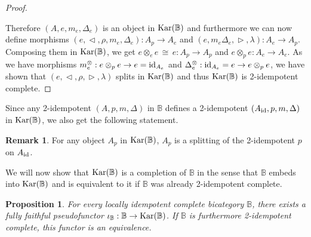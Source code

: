 \documentclass[12pt,oneside,reqno,a4paper]{article}
\newtheorem{proposition}[theorem]{Proposition}
\theoremstyle{definition}
\newtheorem{remark}[theorem]{Remark}
\newcommand{\Kar}[1]{\textup{Kar}(#1)}
\newcommand{\iso}{\,\cong\,}
\newcommand{\id}{\textup{id}}
\newcommand{\bB}{\mathbb{B}}
\newcommand{\lt}{\vartriangleleft}
\newcommand{\rt}{\vartriangleright}
\begin{document}
\begin{proof}
\begin{center}
\end{center}

Therefore $(A,e,m_e,\Delta_e)$ is an object in $\Kar{\bB}$ and furthermore we can now define morphisms $(e,\lt,\rho,m_e,\Delta_e):A_p\to A_e$ and $(e,m_e\Delta_e,\rt,\lambda):A_e\to A_p$. Composing them in $\Kar{\bB}$, we get $e\otimes_e e\iso e:A_p\to A_p$ and $e\otimes_p e:A_e\to A_e$. As we have morphisms $m_e^\otimes: e\otimes_p e \to e=\id_{A_e}$ and $\Delta_e^\otimes: \id_{A_e}=e\to e\otimes_p e$, we have shown that $(e,\lt,\rho,\rt,\lambda)$ splits in $\Kar{\bB}$ and thus $\Kar{\bB}$ is 2-idempotent complete.
\end{proof}

Since any 2-idempotent $(A,p,m,\Delta)$ in $\bB$ defines a 2-idempotent $(A_{\id},p,m,\Delta)$ in $\Kar{\bB}$, we also get the following statement.

\begin{remark} \label{x3}
For any object $A_p$ in $\Kar{\bB}$, $A_p$ is a splitting of the 2-idempotent $p$ on $A_{\id}$.
\end{remark}

We will now show that $\Kar{\bB}$ is a completion of $\bB$ in the sense that $\bB$ embeds into $\Kar{\bB}$ and is equivalent to it if $\bB$ was already 2-idempotent complete.

\begin{proposition} \label{kar2emb}
For every locally idempotent complete bicategory $\bB$, there exists a fully faithful pseudofunctor $\iota_\bB:\bB\to\Kar{\bB}$. If $\bB$ is furthermore 2-idempotent complete, this functor is an equivalence.
\end{proposition}
\end{document}
